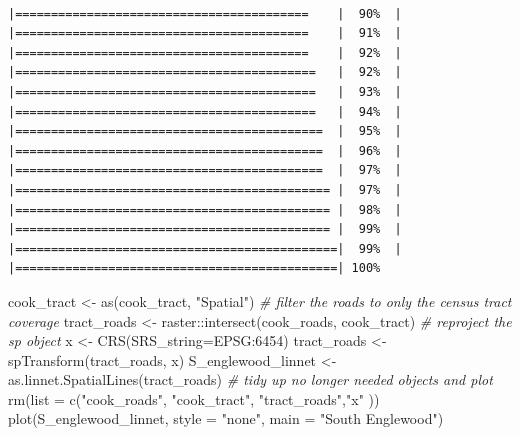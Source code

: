 \documentclass[
  krantz2]{krantz}
\makeatletter
\newenvironment{Shaded}{\begin{snugshade}}{\end{snugshade}}
\newcommand{\AttributeTok}[1]{\textcolor[rgb]{0.61,0.61,0.61}{#1}}
\newcommand{\CommentTok}[1]{\textcolor[rgb]{0.37,0.37,0.37}{\textit{#1}}}
\newcommand{\FunctionTok}[1]{\textcolor[rgb]{0,0,0}{#1}}
\newcommand{\NormalTok}[1]{#1}
\newcommand{\OtherTok}[1]{\textcolor[rgb]{0.37,0.37,0.37}{#1}}
\newcommand{\SpecialCharTok}[1]{\textcolor[rgb]{0,0,0}{#1}}
\newcommand{\StringTok}[1]{\textcolor[rgb]{0.5,0.5,0.5}{#1}}
\newenvironment{kframe}{%
\medskip{}
\setlength{\fboxsep}{.8em}
 \def\at@end@of@kframe{}%
 \ifinner\ifhmode%
  \def\at@end@of@kframe{\end{minipage}}%
  \begin{minipage}{\columnwidth}%
 \fi\fi%
 \def\FrameCommand##1{\hskip\@totalleftmargin \hskip-\fboxsep
 \colorbox{shadecolor}{##1}\hskip-\fboxsep
     \hskip-\linewidth \hskip-\@totalleftmargin \hskip\columnwidth}%
 \MakeFramed {\advance\hsize-\width
   \@totalleftmargin\z@ \linewidth\hsize
   \@setminipage}}%
 {\par\unskip\endMakeFramed%
 \at@end@of@kframe}
\renewenvironment{Shaded}{\begin{kframe}}{\end{kframe}}
\makeatother
\begin{document}
\begin{verbatim}
                             |=========================================    |  90%  |                                                     |=========================================    |  91%  |                                                     |=========================================    |  92%  |                                                     |==========================================   |  92%  |                                                     |==========================================   |  93%  |                                                     |==========================================   |  94%  |                                                     |===========================================  |  95%  |                                                     |===========================================  |  96%  |                                                     |===========================================  |  97%  |                                                     |============================================ |  97%  |                                                     |============================================ |  98%  |                                                     |============================================ |  99%  |                                                     |=============================================|  99%  |                                                     |=============================================| 100%
\end{verbatim}

\begin{Shaded}
\begin{Highlighting}[]
\NormalTok{cook\_tract }\OtherTok{\textless{}{-}} \FunctionTok{as}\NormalTok{(cook\_tract, }\StringTok{"Spatial"}\NormalTok{)}
\CommentTok{\# filter the roads to only the census tract coverage}
\NormalTok{tract\_roads }\OtherTok{\textless{}{-}}\NormalTok{ raster}\SpecialCharTok{::}\FunctionTok{intersect}\NormalTok{(cook\_roads, cook\_tract)}
\CommentTok{\# reproject the sp object}
\NormalTok{x }\OtherTok{\textless{}{-}} \FunctionTok{CRS}\NormalTok{(}\AttributeTok{SRS\_string=}\StringTok{\textquotesingle{}EPSG:6454\textquotesingle{}}\NormalTok{)}
\NormalTok{tract\_roads }\OtherTok{\textless{}{-}} \FunctionTok{spTransform}\NormalTok{(tract\_roads, x)}
\NormalTok{S\_englewood\_linnet }\OtherTok{\textless{}{-}} \FunctionTok{as.linnet.SpatialLines}\NormalTok{(tract\_roads)}
\CommentTok{\# tidy up no longer needed objects and plot}
\FunctionTok{rm}\NormalTok{(}\AttributeTok{list =} \FunctionTok{c}\NormalTok{(}\StringTok{"cook\_roads"}\NormalTok{, }\StringTok{"cook\_tract"}\NormalTok{, }\StringTok{"tract\_roads"}\NormalTok{,}\StringTok{"x"}\NormalTok{ ))}
\FunctionTok{plot}\NormalTok{(S\_englewood\_linnet, }\AttributeTok{style =} \StringTok{"none"}\NormalTok{, }\AttributeTok{main =} \StringTok{"South Englewood"}\NormalTok{)}
\end{Highlighting}
\end{Shaded}
\end{document}
